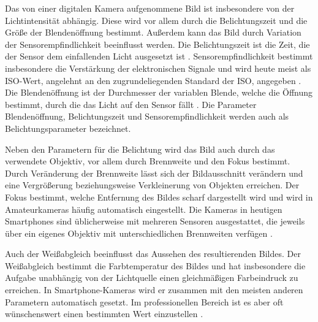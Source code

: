 Das von einer digitalen Kamera aufgenommene Bild ist insbesondere von der Lichtintensität abhängig.
Diese wird vor allem durch die Belichtungszeit und die Größe der Blendenöffnung bestimmt.
Außerdem kann das Bild durch Variation der Sensorempfindlichkeit beeinflusst werden.
Die Belichtungszeit ist die Zeit, die der Sensor dem einfallenden Licht ausgesetzt ist \cite[S. 390ff.]{Schmidt_Videotechnik}.
Sensorempfindlichkeit bestimmt insbesondere die Verstärkung der elektronischen Signale und wird heute meist als \acs{ISO}-Wert, angelehnt an den zugrundeliegenden Standard der \acf{ISO}, angegeben \cite[S. 412ff.]{Schmidt_Videotechnik}.
Die Blendenöffnung ist der Durchmesser der variablen Blende, welche die Öffnung bestimmt, durch die das Licht auf den Sensor fällt \cite[S. 444ff.]{Schmidt_Videotechnik}.
Die Parameter Blendenöffnung, Belichtungszeit und Sensorempfindlichkeit werden auch als Belichtungsparameter bezeichnet.

Neben den Parametern für die Belichtung wird das Bild auch durch das verwendete Objektiv, vor allem durch Brennweite und den Fokus bestimmt.
Durch Veränderung der Brennweite lässt sich der Bildausschnitt verändern und eine Vergrößerung beziehungsweise Verkleinerung von Objekten erreichen.
Der Fokus bestimmt, welche Entfernung des Bildes scharf dargestellt wird und wird in Amateurkameras häufig automatisch eingestellt.
Die Kameras in heutigen Smartphones sind üblicherweise mit mehreren Sensoren ausgestattet, die jeweils über ein eigenes Objektiv mit unterschiedlichen Brennweiten verfügen \cite[S. 499ff.]{Schmidt_Videotechnik}.

Auch der Weißabgleich beeinflusst das Aussehen des resultierenden Bildes.
Der Weißabgleich bestimmt die Farbtemperatur des Bildes und hat insbesondere die Aufgabe unabhängig von der Lichtquelle einen gleichmäßigen Farbeindruck zu erreichen.
In Smartphone-Kameras wird er zusammen mit den meisten anderen Parametern automatisch gesetzt.
Im professionellen Bereich ist es aber oft wünschenswert einen bestimmten Wert einzustellen \cite[S. 434ff.]{Schmidt_Videotechnik}.


